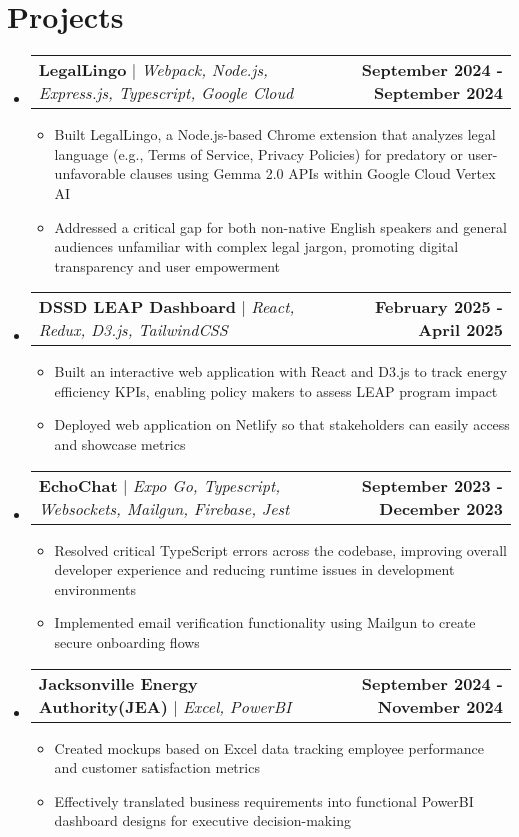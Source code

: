 \documentclass[letterpaper,11pt]{article}
\makeatletter
\newcommand{\resumeItem}[1]{
  \item\small{
    {#1 \vspace{-2pt}}
  }
}
\newcommand{\resumeProjectHeading}[2]{
    \item
    \begin{tabular*}{1.001\textwidth}{l@{\extracolsep{\fill}}r}
      \small#1 & \textbf{\small #2}\\
    \end{tabular*}\vspace{-7pt}
}
\newcommand{\resumeSubHeadingListStart}{\begin{itemize}[leftmargin=0.0in, label={}]}
\newcommand{\resumeSubHeadingListEnd}{\end{itemize}}
\newcommand{\resumeItemListStart}{\begin{itemize}}
\newcommand{\resumeItemListEnd}{\end{itemize}}
\makeatother
\begin{document}
\section{Projects}
    \resumeSubHeadingListStart
        \resumeProjectHeading
          {\textbf{LegalLingo} $|$ \emph{Webpack, Node.js, Express.js, Typescript, Google Cloud}}{September 2024 - September 2024}
          \resumeItemListStart
            \resumeItem{Built LegalLingo, a Node.js-based Chrome extension that analyzes legal language (e.g., Terms of Service, Privacy Policies) for predatory or user-unfavorable clauses using Gemma 2.0 APIs within Google Cloud Vertex AI}
            \resumeItem{Addressed a critical gap for both non-native English speakers and general audiences unfamiliar with complex legal jargon, promoting digital transparency and user empowerment}
          \resumeItemListEnd
        \pagebreak
        \resumeProjectHeading
          {\textbf{DSSD LEAP Dashboard} $|$ \emph{React, Redux, D3.js, TailwindCSS}}{February 2025 - April 2025}
          \resumeItemListStart
            \resumeItem{Built an interactive web application with React and D3.js to track energy efficiency KPIs, enabling policy makers to assess LEAP program impact}
            \resumeItem{Deployed web application on Netlify so that stakeholders can easily access and showcase metrics}
          \resumeItemListEnd
       \resumeProjectHeading
          {\textbf{EchoChat} $|$ \emph{Expo Go, Typescript, Websockets, Mailgun, Firebase, Jest}}{September 2023 - December 2023 }
          \resumeItemListStart
            \resumeItem {Resolved critical TypeScript errors across the codebase, improving overall developer experience and reducing runtime issues in development environments}
            \resumeItem{Implemented email verification functionality using Mailgun to create secure onboarding flows}
          \resumeItemListEnd
        \resumeProjectHeading
          {\textbf{Jacksonville Energy Authority(JEA)} $|$ \emph{Excel, PowerBI}}{September 2024 - November 2024 }
          \resumeItemListStart
            \resumeItem{Created mockups based on Excel data tracking employee performance and customer satisfaction metrics}
            \resumeItem{Effectively translated business requirements into functional PowerBI dashboard designs for executive decision-making}
          \resumeItemListEnd 
    \resumeSubHeadingListEnd

\end{document}

